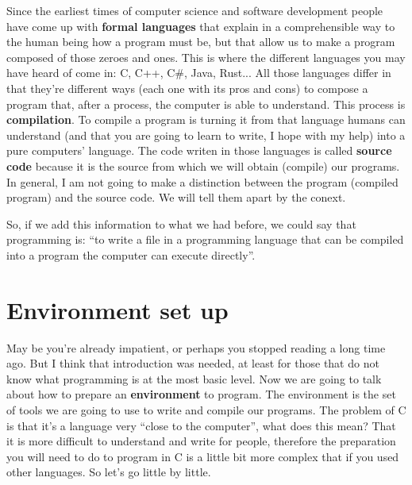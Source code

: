 \documentclass[a4paper]{article}
\begin{document}
Since the earliest times of computer science and software development
people have come up with \textbf{formal languages} that explain in a
comprehensible way to the human being how a program must be, but that allow us
to make a program composed of those zeroes and ones. This is where the different
languages you may have heard of come in: C, C++, C\#, Java, Rust...
All those languages differ in that they're different ways (each one with its
pros and cons) to compose a program that, after a process, the computer is able
to understand. This process is \textbf{compilation}. To compile a program is
turning it from that language humans can understand (and that you are going to
learn to write, I hope with my help) into a pure computers' language. The code
writen in those languages is called \textbf{source code} because it is the
source from which we will obtain (compile) our programs. In general, I am not
going to make a distinction between the program (compiled program) and the
source code. We will tell them apart by the conext.

So, if we add this information to what we had before, we could say that
programming is: ``to write a file in a programming language that can be
compiled into a program the computer can execute directly''.

\section{Environment set up}


May be you're already impatient, or perhaps you stopped reading a long time
ago. But I think that introduction was needed, at least for those that do not
know what programming is at the most basic level. Now we are going to talk about
how to prepare an \textbf{environment} to program. The environment is the set of
tools we are going to use to write and compile our programs.
The problem of C is that it's a language very ``close to the computer'', what
does this mean? That it is more difficult to understand and write for people,
therefore the preparation you will need to do to program in C is a little bit
more complex that if you used other languages. So let's go little by little.
\end{document}
